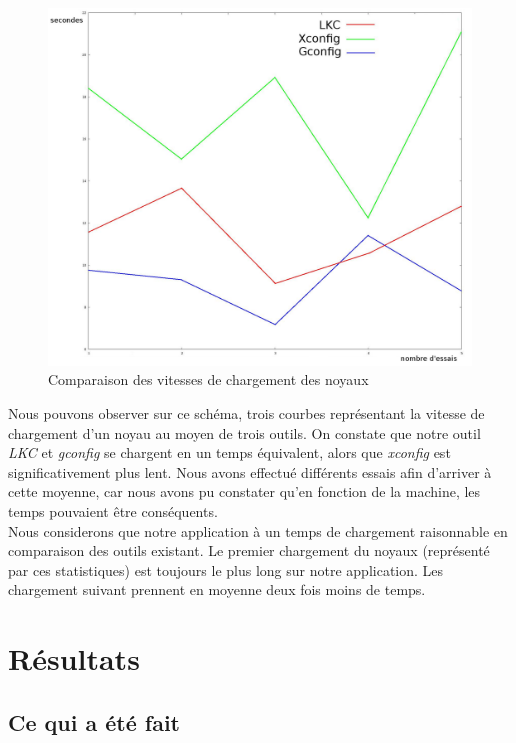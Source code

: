 \documentclass[17pts]{report}
\begin{document}
\begin{figure}[H]
    \includegraphics[scale=0.4]{./illustrations/speed_cmp.jpeg}
    \centering
    \caption{Comparaison des vitesses de chargement des noyaux}
    \label{fig:VitesseChargement}
\end{figure}
Nous pouvons observer sur ce schéma, trois courbes représentant la vitesse
de chargement d'un noyau au moyen de trois outils.
On constate que notre outil \textit{LKC} et \textit{gconfig} se chargent en un
temps équivalent, alors que \textit{xconfig} est significativement plus lent.
Nous avons effectué différents essais afin d'arriver à cette moyenne, car nous
avons pu constater qu'en fonction de la machine, les temps pouvaient être
conséquents. \\
Nous considerons que notre application à un temps de chargement raisonnable
en comparaison des outils existant. Le premier chargement du noyaux (représenté
par ces statistiques) est toujours le plus long sur notre application. Les
chargement suivant prennent en moyenne deux fois moins de temps.

\chapter{Résultats}
\label{cha:Résultats}
\section{Ce qui a été fait}
\label{sec:Ce qui a été fait}
\end{document}
